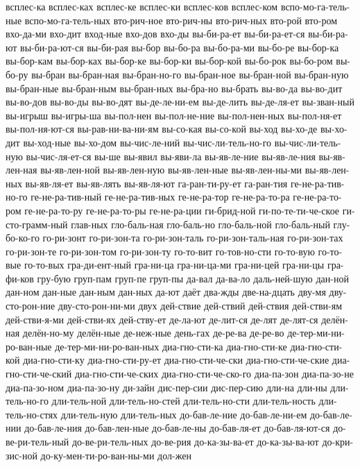 {всплес-ка
всплес-ках
всплес-ке
всплес-ки
всплес-ков
всплес-ком
вспо-мо-га-тель-ные
вспо-мо-га-тель-ных
вто-рич-ное
вто-рич-ны
вто-рич-ных
вто-рой
вто-ром
вхо-да-ми
вхо-дит
вход-ные
вхо-дов
вхо-ды
вы-би-ра-ет
вы-би-ра-ет-ся
вы-би-ра-ют
вы-би-ра-ют-ся
вы-би-рая
вы-бор
вы-бо-ра
вы-бо-ра-ми
вы-бо-ре
вы-бор-ка
вы-бор-кам
вы-бор-ках
вы-бор-ке
вы-бор-ки
вы-бор-кой
вы-бо-рок
вы-бо-ром
вы-бо-ру
вы-бран
вы-бран-ная
вы-бран-но-го
вы-бран-ное
вы-бран-ной
вы-бран-ную
вы-бран-ные
вы-бран-ным
вы-бран-ных
вы-бра-но
вы-брать
вы-во-да
вы-во-дит
вы-во-дов
вы-во-ды
вы-во-дят
вы-де-ле-ни-ем
вы-де-лить
вы-де-ля-ет
вы-зван-ный
вы-игрыш
вы-игры-ша
вы-пол-нен
вы-пол-не-ние
вы-пол-нен-ных
вы-пол-ня-ет
вы-пол-ня-ют-ся
вы-рав-ни-ва-ни-ям
вы-со-кая
вы-со-кой
вы-ход
вы-хо-де
вы-хо-дит
вы-ход-ные
вы-хо-дом
вы-чис-ле-ний
вы-чис-ли-тель-но-го
вы-чис-ли-тель-ную
вы-чис-ля-ет-ся
вы-ше
вы-явил
вы-яви-ла
вы-яв-ле-ние
вы-яв-ле-ния
вы-яв-лен-ная
вы-яв-лен-ной
вы-яв-лен-ную
вы-яв-лен-ные
вы-яв-лен-ны-ми
вы-яв-лен-ных
вы-яв-ля-ет
вы-яв-лять
вы-яв-ля-ют
га-ран-ти-ру-ет
га-ран-тия
ге-не-ра-тив-но-го
ге-не-ра-тив-ный
ге-не-ра-тив-ных
ге-не-ра-тор
ге-не-ра-то-ра
ге-не-ра-то-ром
ге-не-ра-то-ру
ге-не-ра-то-ры
ге-не-ра-ции
ги-брид-ной
ги-по-те-ти-че-ское
ги-сто-грамм-ный
глав-ных
гло-баль-ная
гло-баль-но
гло-баль-ной
гло-баль-ный
глу-бо-ко-го
го-ри-зонт
го-ри-зон-та
го-ри-зон-таль
го-ри-зон-таль-ная
го-ри-зон-тах
го-ри-зон-те
го-ри-зон-том
го-ри-зон-ту
го-то-вит
го-тов-но-сти
го-то-вую
го-то-вые
го-то-вых
гра-ди-ент-ный
гра-ни-ца
гра-ни-ца-ми
гра-ни-цей
гра-ни-цы
гра-фи-ков
гру-бую
груп-пам
груп-пе
груп-пы
да-вал
да-ва-ло
даль-ней-шую
дан-ной
дан-ном
дан-ные
дан-ным
дан-ных
да-ют
даёт
два-жды
две-на-дцать
дву-мя
дву-сто-рон-ние
дву-сто-рон-ни-ми
двух
дей-ствие
дей-ствий
дей-ствия
дей-стви-ям
дей-стви-я-ми
дей-стви-ях
дей-ству-ет
де-ла-ют
де-лит-ся
де-лят
де-лят-ся
делён-ная
делён-но-му
делён-ные
де-неж-ные
день-гах
де-ре-ва
де-ре-во
де-тер-ми-ни-ро-ван-ные
де-тер-ми-ни-ро-ван-ных
диа-гно-сти-ка
диа-гно-сти-ке
диа-гно-сти-кой
диа-гно-сти-ку
диа-гно-сти-ру-ет
диа-гно-сти-че-ски
диа-гно-сти-че-ские
диа-гно-сти-че-ский
диа-гно-сти-че-ских
диа-гно-сти-че-ско-го
диа-па-зон
диа-па-зо-не
диа-па-зо-ном
диа-па-зо-ну
ди-зайн
дис-пер-сии
дис-пер-сию
дли-на
дли-ны
дли-тель-но-го
дли-тель-ной
дли-тель-но-стей
дли-тель-но-сти
дли-тель-ность
дли-тель-но-стях
дли-тель-ную
дли-тель-ных
до-бав-ле-ние
до-бав-ле-ни-ем
до-бав-ле-нии
до-бав-ле-ния
до-бав-лен-ные
до-бав-ле-ны
до-бав-ля-ет
до-бав-ля-ют-ся
до-ве-ри-тель-ный
до-ве-ри-тель-ных
до-ве-рия
до-ка-зы-ва-ет
до-ка-зы-ва-ют
до-кри-зис-ной
до-ку-мен-ти-ро-ван-ны-ми
дол-жен
}
